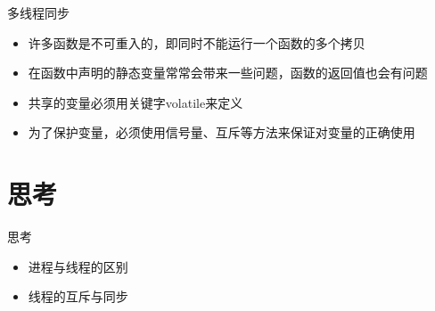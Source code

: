 \begin{frame}{多线程同步}
\begin{itemize}
\item 许多函数是不可重入的，即同时不能运行一个函数的多个拷贝
\item 在函数中声明的静态变量常常会带来一些问题，函数的返回值也会有问题
\item 共享的变量必须用关键字volatile来定义
\item 为了保护变量，必须使用信号量、互斥等方法来保证对变量的正确使用
\end{itemize}
\end{frame}


\section{思考}
\begin{frame}{思考}
\begin{itemize}
\item 进程与线程的区别
\item 线程的互斥与同步
\end{itemize}
\end{frame}




